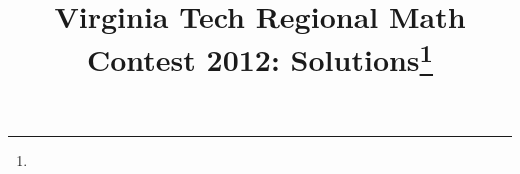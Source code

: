 \documentclass[10pt]{article}
\begin{document}
\title{Virginia Tech Regional Math Contest 2012: Solutions\footnote{\disclaimer}}
\author{\vspace{-2ex}}
\date{\vspace{-5ex}} %
\maketitle

%

%

%

%

%

%

%
\end{document}
